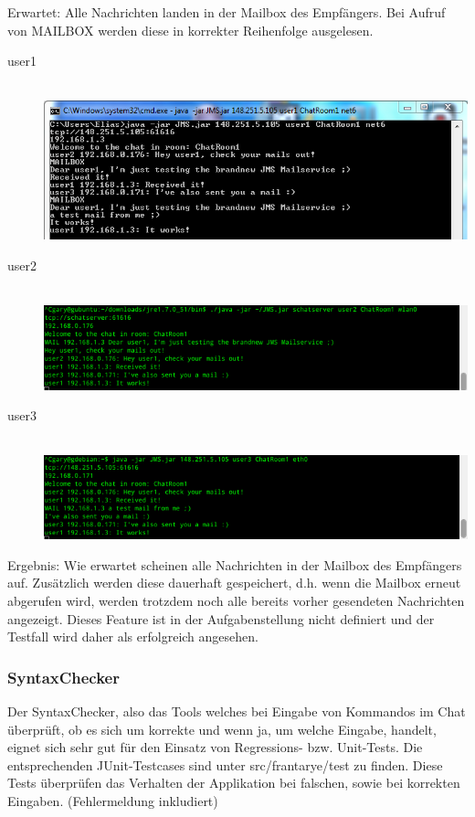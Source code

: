 \documentclass[11pt, a4paper]{article}
\begin{document}
Erwartet: Alle Nachrichten landen in der Mailbox des Empfängers. Bei Aufruf von MAILBOX werden diese in korrekter Reihenfolge ausgelesen.

\begin{center}
\begin{description}
\item[user1] \hfill \\   \includegraphics[width=6in]{pic/mail_user1.png}
\item[user2] \hfill \\   \includegraphics[width=6in]{pic/mail_user2.png}
\item[user3] \hfill \\   \includegraphics[width=6in]{pic/mail_user3.png}
\end{description}
\end{center}

Ergebnis: Wie erwartet scheinen alle Nachrichten in der Mailbox des Empfängers auf. Zusätzlich werden diese dauerhaft gespeichert, d.h. wenn die Mailbox erneut
abgerufen wird, werden trotzdem noch alle bereits vorher gesendeten Nachrichten angezeigt. Dieses Feature ist in der Aufgabenstellung nicht definiert und der
Testfall wird daher als erfolgreich angesehen.

\subsubsection{SyntaxChecker}
Der SyntaxChecker, also das Tools welches bei Eingabe von Kommandos im Chat überprüft, ob es sich um korrekte und wenn ja, um welche Eingabe, handelt,
eignet sich sehr gut für den Einsatz von Regressions- bzw. Unit-Tests.
Die entsprechenden JUnit-Testcases sind unter src/frantarye/test zu finden.
Diese Tests überprüfen das Verhalten der Applikation bei falschen, sowie bei korrekten Eingaben. (Fehlermeldung inkludiert)
\end{document}
